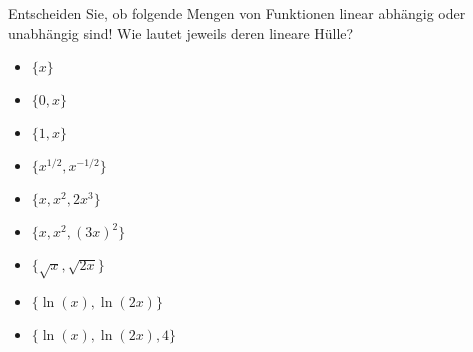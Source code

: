 \item Entscheiden Sie, ob folgende Mengen von Funktionen linear abhängig oder unabhängig sind! Wie lautet jeweils deren lineare Hülle?
\begin{multicols}{3}
\begin{itemize}
	\item $\lbrace x \rbrace$
	\item $\lbrace 0, x \rbrace$
	\item $\lbrace 1, x \rbrace$
	\item $\lbrace x^{1/2}, x^{-1/2} \rbrace$
	\item $\lbrace x, x^2, 2x^3 \rbrace$
	\item $\lbrace x, x^2, (3x)^2 \rbrace$
	\item $\lbrace \sqrt{x}, \sqrt{2x} \rbrace$
	\item $\lbrace \ln(x), \ln(2x) \rbrace$
	\item $\lbrace \ln(x), \ln(2x), 4 \rbrace$
\end{itemize}
\end{multicols}
